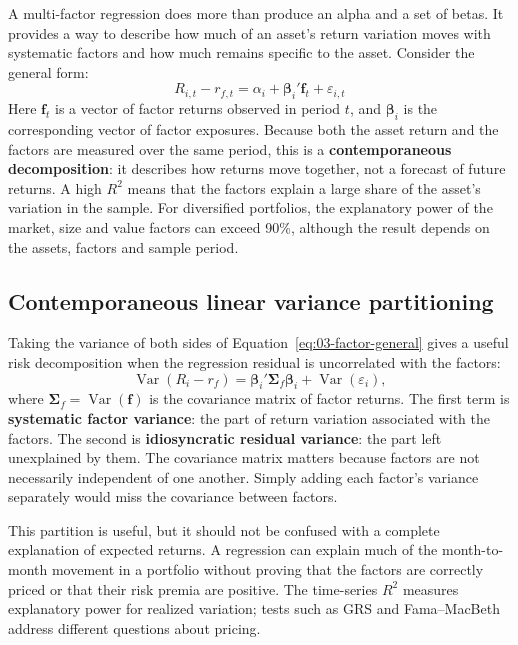 A multi-factor regression does more than produce an alpha and a set of betas. It provides a way to describe how much of an asset's return variation moves with systematic factors and how much remains specific to the asset. Consider the general form:
\begin{equation}
  R_{i,t} - r_{f,t} = \alpha_i + \boldsymbol{\beta}_i' \mathbf{f}_t + \varepsilon_{i,t}
  \label{eq:03-factor-general}
\end{equation}
Here $\mathbf{f}_t$ is a vector of factor returns observed in period $t$, and $\boldsymbol{\beta}_i$ is the corresponding vector of factor exposures. Because both the asset return and the factors are measured over the same period, this is a \textbf{contemporaneous decomposition}: it describes how returns move together, not a forecast of future returns. A high $R^2$ means that the factors explain a large share of the asset's variation in the sample. For diversified portfolios, the explanatory power of the market, size and value factors can exceed 90\%, although the result depends on the assets, factors and sample period.

\subsection{Contemporaneous linear variance partitioning}

Taking the variance of both sides of Equation~\eqref{eq:03-factor-general} gives a useful risk decomposition when the regression residual is uncorrelated with the factors:
\begin{equation}
  \operatorname{Var}(R_i-r_f)
  = \boldsymbol{\beta}_i' \boldsymbol{\Sigma}_f \boldsymbol{\beta}_i
  + \operatorname{Var}(\varepsilon_i),
  \label{eq:03-vardec}
\end{equation}
where $\boldsymbol{\Sigma}_f=\operatorname{Var}(\mathbf{f})$ is the covariance matrix of factor returns. The first term is \textbf{systematic factor variance}: the part of return variation associated with the factors. The second is \textbf{idiosyncratic residual variance}: the part left unexplained by them. The covariance matrix matters because factors are not necessarily independent of one another. Simply adding each factor's variance separately would miss the covariance between factors.

This partition is useful, but it should not be confused with a complete explanation of expected returns. A regression can explain much of the month-to-month movement in a portfolio without proving that the factors are correctly priced or that their risk premia are positive. The time-series $R^2$ measures explanatory power for realized variation; tests such as GRS and Fama--MacBeth address different questions about pricing.

